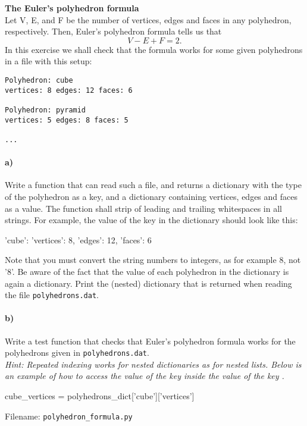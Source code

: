 \begin{Problem}{\textbf{The Euler's polyhedron formula}}
\noindent
\\Let V, E, and F be the number of vertices, edges and faces in any polyhedron, respectively. Then, Euler's polyhedron formula tells us that
$$
V-E+F=2.
$$
In this exercise we shall check that the formula works for some given polyhedrons in a file with this setup:
\begin{lstlisting}
Polyhedron: cube
vertices: 8 edges: 12 faces: 6

Polyhedron: pyramid
vertices: 5 edges: 8 faces: 5

...
\end{lstlisting}

\paragraph{a)}
Write a function that can read such a file, and returns a dictionary with the type of the polyhedron as a key, and a dictionary containing vertices, edges and faces as a value. The function shall strip of leading and trailing whitespaces in all strings. For example, the value of the key  in the dictionary should look like this:
\begin{python}
'cube': {'vertices': 8, 'edges': 12, 'faces': 6}
\end{python}
Note that you must convert the string numbers to integers, as for example $8$, not '$8$'. Be aware of the fact that the value of each polyhedron in the dictionary is again a dictionary. Print the (nested) dictionary that is returned when reading the file \texttt{polyhedrons.dat}.
\paragraph{b)}
Write a test function  that checks that Euler's polyhedron formula works for the polyhedrons given in \texttt{polyhedrons.dat}.\\
\noindent
\emph{Hint: Repeated indexing works for nested dictionaries as for nested lists. Below is an example of how to access the value of the key  inside the value of the key .}
\begin{python}
cube_vertices = polyhedrons_dict['cube']['vertices']
\end{python}

Filename: \texttt{polyhedron\_formula.py}

\end{Problem}

